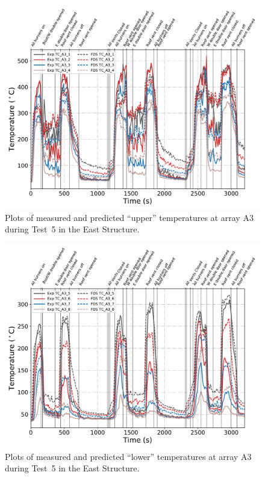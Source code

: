 \clearpage
\begin{figure}[p]
	\centering
	\includegraphics[width=\columnwidth]{Figures/Plots/Validation/Temperature/Test_5_TC_A3_upper}
	\caption{Plots of measured and predicted ``upper'' temperatures at array A3 during Test~5 in the East Structure.}
	\label{fig:TCA3_upper_data_Test5}
\end{figure}
\begin{figure}[p]
	\centering
	\includegraphics[width=\columnwidth]{Figures/Plots/Validation/Temperature/Test_5_TC_A3_lower}
	\caption{Plots of measured and predicted ``lower'' temperatures at array A3 during Test~5 in the East Structure.}
	\label{fig:TCA3_lower_data_Test5}
\end{figure}

